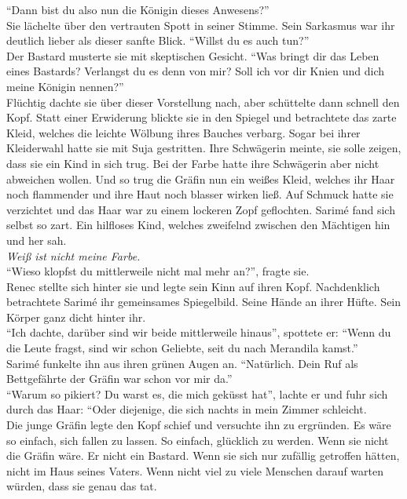 ``Dann bist du also nun die Königin dieses Anwesens?''\\
Sie lächelte über den vertrauten Spott in seiner Stimme. Sein Sarkasmus war ihr deutlich lieber als 
dieser sanfte Blick. ``Willst du es auch tun?''\\
Der Bastard musterte sie mit skeptischen Gesicht. ``Was bringt dir das Leben eines Bastards? 
Verlangst du es denn von mir? Soll ich vor dir Knien und dich meine Königin nennen?''\\
Flüchtig dachte sie über dieser Vorstellung nach, aber schüttelte dann schnell den Kopf.
Statt einer Erwiderung blickte sie in den Spiegel und betrachtete das zarte Kleid, welches die 
leichte Wölbung ihres Bauches verbarg. Sogar bei ihrer Kleiderwahl hatte sie mit Suja gestritten. 
Ihre Schwägerin meinte, sie solle zeigen, dass sie ein Kind in sich trug. Bei der Farbe hatte ihre 
Schwägerin aber nicht abweichen wollen. Und so trug die Gräfin nun ein weißes Kleid, welches ihr 
Haar noch flammender und ihre Haut noch blasser wirken ließ. Auf Schmuck hatte sie verzichtet und 
das Haar war zu einem lockeren Zopf geflochten. Sarimé fand sich selbst so zart. Ein hilfloses Kind, 
welches zweifelnd zwischen den Mächtigen hin und her sah.\\
\textit{Weiß ist nicht meine Farbe.}\\
``Wieso klopfst du mittlerweile nicht mal mehr an?'', fragte sie.\\
Renec stellte sich hinter sie und legte sein Kinn auf ihren Kopf. Nachdenklich betrachtete 
Sarimé ihr gemeinsames Spiegelbild. Seine Hände an ihrer Hüfte. Sein Körper ganz dicht hinter 
ihr.\\
``Ich dachte, darüber sind wir beide mittlerweile hinaus'', spottete er: ``Wenn du die Leute fragst,
sind wir schon Geliebte, seit du nach Merandila kamst.''\\
Sarimé funkelte ihn aus ihren grünen Augen an. ``Natürlich. Dein Ruf als Bettgefährte der Gräfin 
war schon vor mir da.''\\
``Warum so pikiert? Du warst es, die mich geküsst hat'', lachte er und fuhr sich durch das Haar: 
``Oder diejenige, die sich nachts in mein Zimmer schleicht.\\
Die junge Gräfin legte den Kopf schief und versuchte ihn zu ergründen. Es wäre so einfach, sich 
fallen zu lassen. So einfach, glücklich zu werden. Wenn sie nicht die Gräfin wäre. Er nicht ein 
Bastard. Wenn sie sich nur zufällig getroffen hätten, nicht im Haus seines Vaters. Wenn nicht viel 
zu viele Menschen darauf warten würden, dass sie genau das tat.\\
